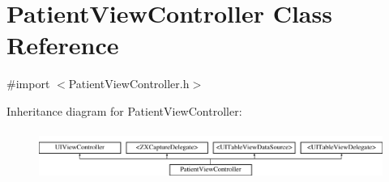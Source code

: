 \hypertarget{interface_patient_view_controller}{}\section{Patient\+View\+Controller Class Reference}
\label{interface_patient_view_controller}


{\ttfamily \#import $<$Patient\+View\+Controller.\+h$>$}

Inheritance diagram for Patient\+View\+Controller\+:\begin{figure}[H]
\begin{center}
\leavevmode
\includegraphics[height=1.637427cm]{interface_patient_view_controller}
\end{center}
\end{figure}
